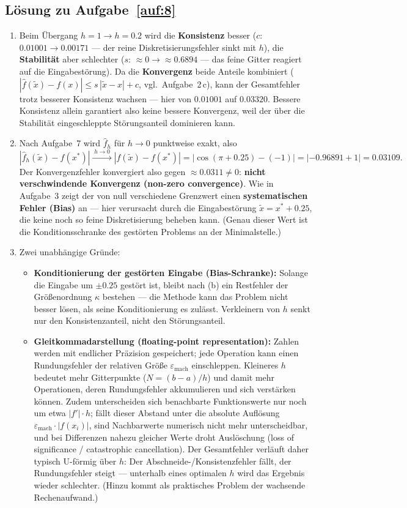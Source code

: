 \documentclass[a4paper,11pt]{scrartcl}
\begin{document}
\subsection*{Lösung zu Aufgabe~\ref{auf:8}}

\begin{enumerate}[label=(\alph*)]
  \item Beim Übergang $h = 1 \to h = 0.2$ wird die \textbf{Konsistenz} besser ($c$: $0.01001 \to 0.00171$ --- der reine Diskretisierungsfehler sinkt mit $h$), die \textbf{Stabilität} aber schlechter ($s$: $\approx 0 \to \approx 0.6894$ --- das feine Gitter reagiert auf die Eingabestörung). Da die \textbf{Konvergenz} beide Anteile kombiniert ($|\hat{f}(\tilde{x}) - f(x)| \leq s\,|\tilde{x}-x| + c$, vgl.\ Aufgabe~2\,c), kann der Gesamtfehler trotz besserer Konsistenz wachsen --- hier von $0.01001$ auf $0.03320$. Bessere Konsistenz allein garantiert also keine bessere Konvergenz, weil der über die Stabilität eingeschleppte Störungsanteil dominieren kann.
  \item Nach Aufgabe~7 wird $\hat{f}_h$ für $h \to 0$ punktweise exakt, also
  \[ \left| \hat{f}_h(\tilde{x}) - f(x^*) \right| \xrightarrow{\;h \to 0\;} \left| f(\tilde{x}) - f(x^*) \right| = \left| \cos(\pi + 0.25) - (-1) \right| = |-0.96891 + 1| = 0.03109. \]
  Der Konvergenzfehler konvergiert also gegen $\approx 0.0311 \neq 0$: \textbf{nicht verschwindende Konvergenz (non-zero convergence)}. Wie in Aufgabe~3 zeigt der von null verschiedene Grenzwert einen \textbf{systematischen Fehler (Bias)} an --- hier verursacht durch die Eingabestörung $\tilde{x} = x^* + 0.25$, die keine noch so feine Diskretisierung beheben kann. (Genau dieser Wert ist die Konditionsschranke des gestörten Problems an der Minimalstelle.)
  \item Zwei unabhängige Gründe:
  \begin{itemize}[nosep]
    \item \textbf{Konditionierung der gestörten Eingabe (Bias-Schranke):} Solange die Eingabe um $\pm 0.25$ gestört ist, bleibt nach (b) ein Restfehler der Größenordnung $\kappa$ bestehen --- die Methode kann das Problem nicht besser lösen, als seine Konditionierung es zulässt. Verkleinern von $h$ senkt nur den Konsistenzanteil, nicht den Störungsanteil.
    \item \textbf{Gleitkommadarstellung (floating-point representation):} Zahlen werden mit endlicher Präzision gespeichert; jede Operation kann einen Rundungsfehler der relativen Größe $\varepsilon_{\text{mach}}$ einschleppen. Kleineres $h$ bedeutet mehr Gitterpunkte ($N = (b-a)/h$) und damit mehr Operationen, deren Rundungsfehler akkumulieren und sich verstärken können. Zudem unterscheiden sich benachbarte Funktionswerte nur noch um etwa $|f'| \cdot h$; fällt dieser Abstand unter die absolute Auflösung $\varepsilon_{\text{mach}} \cdot |f(x_i)|$, sind Nachbarwerte numerisch nicht mehr unterscheidbar, und bei Differenzen nahezu gleicher Werte droht Auslöschung (loss of significance / catastrophic cancellation). Der Gesamtfehler verläuft daher typisch U-förmig über $h$: Der Abschneide-/Konsistenzfehler fällt, der Rundungsfehler steigt --- unterhalb eines optimalen $h$ wird das Ergebnis wieder schlechter. (Hinzu kommt als praktisches Problem der wachsende Rechenaufwand.)

\end{itemize}
\end{enumerate}
\end{document}
